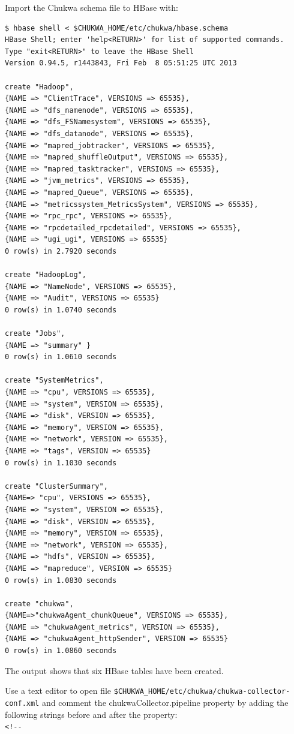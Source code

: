 Import the Chukwa schema file to HBase with:
\begin{verbatim}
$ hbase shell < $CHUKWA_HOME/etc/chukwa/hbase.schema
HBase Shell; enter 'help<RETURN>' for list of supported commands.
Type "exit<RETURN>" to leave the HBase Shell
Version 0.94.5, r1443843, Fri Feb  8 05:51:25 UTC 2013

create "Hadoop",
{NAME => "ClientTrace", VERSIONS => 65535},
{NAME => "dfs_namenode", VERSIONS => 65535},
{NAME => "dfs_FSNamesystem", VERSIONS => 65535},
{NAME => "dfs_datanode", VERSIONS => 65535},
{NAME => "mapred_jobtracker", VERSIONS => 65535},
{NAME => "mapred_shuffleOutput", VERSIONS => 65535},
{NAME => "mapred_tasktracker", VERSIONS => 65535},
{NAME => "jvm_metrics", VERSIONS => 65535},
{NAME => "mapred_Queue", VERSIONS => 65535},
{NAME => "metricssystem_MetricsSystem", VERSIONS => 65535},
{NAME => "rpc_rpc", VERSIONS => 65535},
{NAME => "rpcdetailed_rpcdetailed", VERSIONS => 65535},
{NAME => "ugi_ugi", VERSIONS => 65535}
0 row(s) in 2.7920 seconds

create "HadoopLog",
{NAME => "NameNode", VERSIONS => 65535},
{NAME => "Audit", VERSIONS => 65535}
0 row(s) in 1.0740 seconds

create "Jobs",
{NAME => "summary" }
0 row(s) in 1.0610 seconds

create "SystemMetrics",
{NAME => "cpu", VERSIONS => 65535},
{NAME => "system", VERSION => 65535},
{NAME => "disk", VERSION => 65535},
{NAME => "memory", VERSION => 65535},
{NAME => "network", VERSION => 65535},
{NAME => "tags", VERSION => 65535}
0 row(s) in 1.1030 seconds

create "ClusterSummary",
{NAME=> "cpu", VERSIONS => 65535},
{NAME => "system", VERSION => 65535},
{NAME => "disk", VERSION => 65535},
{NAME => "memory", VERSION => 65535},
{NAME => "network", VERSION => 65535},
{NAME => "hdfs", VERSION => 65535},
{NAME => "mapreduce", VERSION => 65535}
0 row(s) in 1.0830 seconds

create "chukwa",
{NAME=>"chukwaAgent_chunkQueue", VERSIONS => 65535},
{NAME => "chukwaAgent_metrics", VERSION => 65535},
{NAME => "chukwaAgent_httpSender", VERSION => 65535}
0 row(s) in 1.0860 seconds
\end{verbatim}

The output shows that six HBase tables have been created.

Use a text editor to open file \verb|$CHUKWA_HOME/etc/chukwa/chukwa-collector-conf.xml| and comment the chukwaCollector.pipeline property by adding the following strings before and after the property: \\
\verb|<!--|\\

